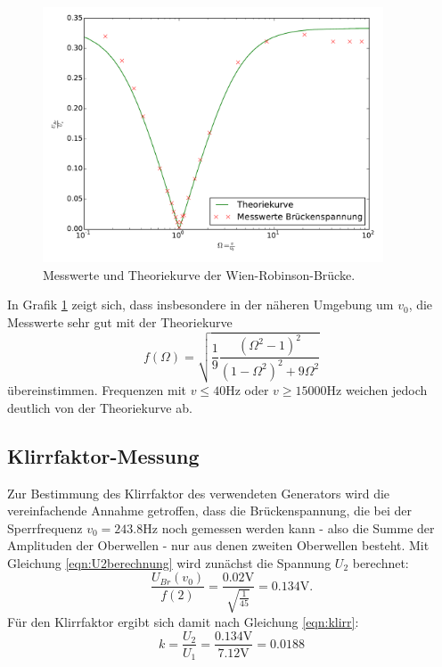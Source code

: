 \begin{figure}
  \centering
  \includegraphics[width=0.9\textwidth]{wien-robinson.pdf}
  \caption{Messwerte und Theoriekurve der Wien-Robinson-Brücke.}
  \label{fig:wien-robinson}
\end{figure}
In Grafik \ref{fig:wien-robinson} zeigt sich, dass insbesondere in der näheren
Umgebung um $v_0$, die Messwerte sehr gut mit der Theoriekurve
\begin{equation}
f(\Omega)=\sqrt{\frac{1}{9}\frac{(\Omega^2-1)^2}
{(1-\Omega^2)^2+9\Omega^2}}
\end{equation}
 übereinstimmen.
Frequenzen mit $v \leq 40 \si{\hertz}$ oder $v \geq 15000 \si{\hertz}$ weichen
jedoch deutlich von der Theoriekurve ab.

\subsection{Klirrfaktor-Messung}
Zur Bestimmung des Klirrfaktor des verwendeten Generators wird die vereinfachende
Annahme getroffen, dass die Brückenspannung, die bei der Sperrfrequenz
$v_0=243.8 \si{\hertz}$ noch gemessen werden kann - also die Summe der Amplituden
der  Oberwellen - nur aus denen zweiten Oberwellen besteht.
Mit Gleichung \eqref{eqn:U2berechnung} wird zunächst die Spannung $U_2$ berechnet:
\begin{equation*}
  \frac{U_{Br}(v_0)}{f(2)} = \frac{0.02\si{\volt}}{\sqrt{\frac{1}{45}}} = 0.134 \si{\volt}.
  \label{eqn:U2}
\end{equation*}
Für den Klirrfaktor ergibt sich damit nach Gleichung \eqref{eqn:klirr}:
\begin{equation*}
  k = \frac{U_2}{U_1} = \frac{0.134 \si{\volt}}{7.12\si{\volt}} = 0.0188
  \label{eqn:klirrfaktor_berechnung}
\end{equation*}
